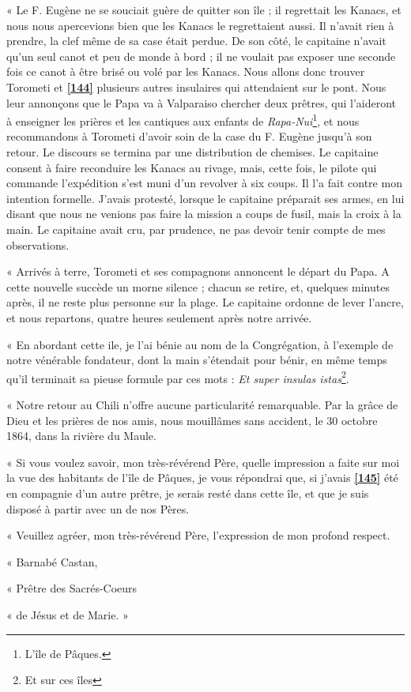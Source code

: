 \documentclass{article}
\begin{document}
        
    « Le F. Eugène ne se souciait guère de quitter son île ; il regrettait les Kanacs, et nous nous apercevions bien que les Kanacs le regrettaient aussi. Il n'avait rien à prendre, la clef même de sa case était perdue. De son côté, le capitaine n'avait qu'un seul canot et peu de monde à bord ; il ne voulait pas exposer une seconde fois ce canot à être brisé ou volé par les Kanacs. Nous allons donc trouver Torometi et \href{https://gallica.bnf.fr/iiif/ark:/12148/bpt6k5449280k/f151/full/full/0/native.jpg}{\textbf{[144]}} plusieurs autres insulaires qui attendaient sur le pont. Nous leur annonçons que le Papa va à Valparaiso chercher deux prêtres, qui l'aideront à enseigner les prières et les cantiques aux enfants de \textit{Rapa-Nui}\footnote{L'île de Pâques.}, et nous recommandons à Torometi d'avoir soin de la case du F. Eugène jusqu'à son retour. Le discours se termina par une distribution de chemises. Le capitaine consent à faire reconduire les Kanacs au rivage, mais, cette fois, le pilote qui commande l'expédition s'est muni d'un revolver à six coups. Il l'a fait contre mon intention formelle. J'avais protesté, lorsque le capitaine préparait ses armes, en lui disant que nous ne venions pas faire la mission a coups de fusil, mais la croix à la main. Le capitaine avait cru, par prudence, ne pas devoir tenir compte de mes observations.
         
        
    « Arrivés à terre, Torometi et ses compagnons annoncent le départ du Papa. A cette nouvelle succède un morne silence ; chacun se retire, et, quelques minutes après, il ne reste plus personne sur la plage. Le capitaine ordonne de lever l'ancre, et nous repartons, quatre heures seulement après notre arrivée.
         
        
    « En abordant cette ile, je l'ai bénie au nom de la Congrégation, à l'exemple de notre vénérable fondateur, dont la main s'étendait pour bénir, en même temps qu'il terminait sa pieuse formule par ces mots : \textit{Et super insulas istas}\footnote{Et sur ces îles}.
         
        
    « Notre retour au Chili n'offre aucune particularité remarquable. Par la grâce de Dieu et les prières de nos amis, nous mouillâmes sans accident, le 30 octobre 1864, dans la rivière du Maule.
         
        
    « Si vous voulez savoir, mon très-révérend Père, quelle impression a faite sur moi la vue des habitants de l'île de Pâques, je vous répondrai que, si j'avais \href{https://gallica.bnf.fr/iiif/ark:/12148/bpt6k5449280k/f152/full/full/0/native.jpg}{\textbf{[145]}} été en compagnie d'un autre prêtre, je serais resté dans cette île, et que je suis disposé à partir avec un de nos Pères.
         
        
    « Veuillez agréer, mon très-révérend Père, l'expression de mon profond respect.
         
        
    « Barnabé Castan,
         
        
    « Prêtre des Sacrés-Coeurs
         
        
    « de Jésus et de Marie. »
      
  
        
\end{document}
